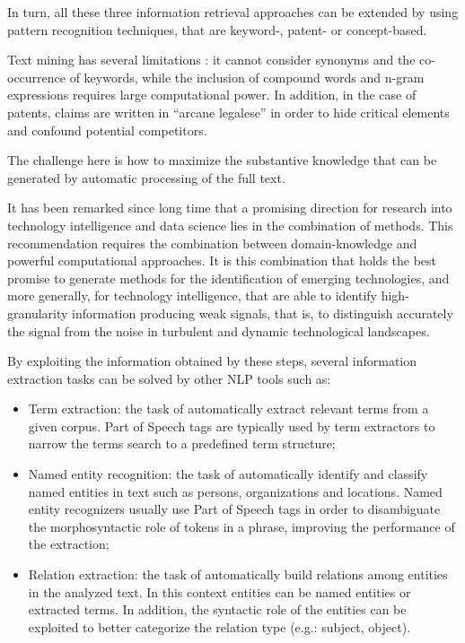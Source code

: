 \documentclass[b5paper,]{book}
\theoremstyle{definition}
\theoremstyle{definition}
\theoremstyle{definition}
\theoremstyle{remark}
\begin{document}
In turn, all these three information retrieval approaches can be
extended by using pattern recognition techniques, that are keyword-,
patent- or concept-based.

Text mining has several limitations : it cannot consider synonyms and
the co-occurrence of keywords, while the inclusion of compound words and
n-gram expressions requires large computational power. In addition, in
the case of patents, claims are written in ``arcane legalese'' in order
to hide critical elements and confound potential competitors.

The challenge here is how to maximize the substantive knowledge that can
be generated by automatic processing of the full text.

It has been remarked since long time that a promising direction for
research into technology intelligence and data science lies in the
combination of methods. This recommendation requires the combination
between domain-knowledge and powerful computational approaches. It is
this combination that holds the best promise to generate methods for the
identification of emerging technologies, and more generally, for
technology intelligence, that are able to identify high-granularity
information producing weak signals, that is, to distinguish accurately
the signal from the noise in turbulent and dynamic technological
landscapes.

By exploiting the information obtained by these steps, several
information extraction tasks can be solved by other NLP tools such as:

\begin{itemize}
\item
  Term extraction: the task of automatically extract relevant terms from
  a given corpus. Part of Speech tags are typically used by term
  extractors to narrow the terms search to a predefined term structure;
\item
  Named entity recognition: the task of automatically identify and
  classify named entities in text such as persons, organizations and
  locations. Named entity recognizers usually use Part of Speech tags in
  order to disambiguate the morphosyntactic role of tokens in a phrase,
  improving the performance of the extraction;
\item
  Relation extraction: the task of automatically build relations among
  entities in the analyzed text. In this context entities can be named
  entities or extracted terms. In addition, the syntactic role of the
  entities can be exploited to better categorize the relation type
  (e.g.: subject, object).
\end{itemize}
\end{document}
